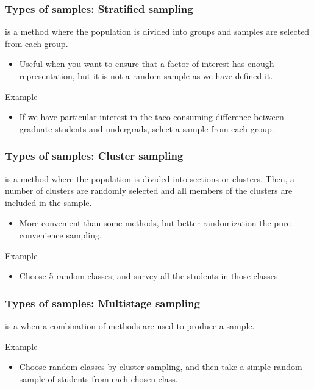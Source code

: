 \documentclass[xcolor=table]{beamer}
\begin{document}
\begin{frame}
\frametitle{Types of samples: Stratified sampling}

\begin{block}{}
\large {} is a method where the population is divided into groups and samples are selected from each group.
\begin{itemize}
\item Useful when you want to ensure that a factor of interest has enough representation, but it is not a random sample as we have defined it.
\end{itemize}
\end{block}
\pause
\begin{exampleblock}{Example}
\begin{itemize}
\item If we have particular interest in the taco consuming difference between graduate students and undergrads, select a sample from each group.
\end{itemize}
\end{exampleblock}
\end{frame}

\begin{frame}
\frametitle{Types of samples: Cluster sampling}

\begin{block}{}
\large {} is a method where the population is divided into sections or clusters. Then, a number of clusters are randomly selected and all members of the clusters are included in the sample.
\begin{itemize}
\item More convenient than some methods, but better randomization the pure convenience sampling.
\end{itemize}
\end{block}
\pause
\begin{exampleblock}{Example}
\begin{itemize}
\item Choose 5 random classes, and survey all the students in those classes.
\end{itemize}
\end{exampleblock}
\end{frame}

\begin{frame}
\frametitle{Types of samples: Multistage sampling}

\begin{block}{}
\large {} is a when a combination of methods are used to produce a sample.
\end{block}
\pause
\begin{exampleblock}{Example}
\begin{itemize}
\item Choose random classes by cluster sampling, and then take a simple random sample of students from each chosen class.  
\end{itemize}
\end{exampleblock}
\end{frame}
\end{document}
